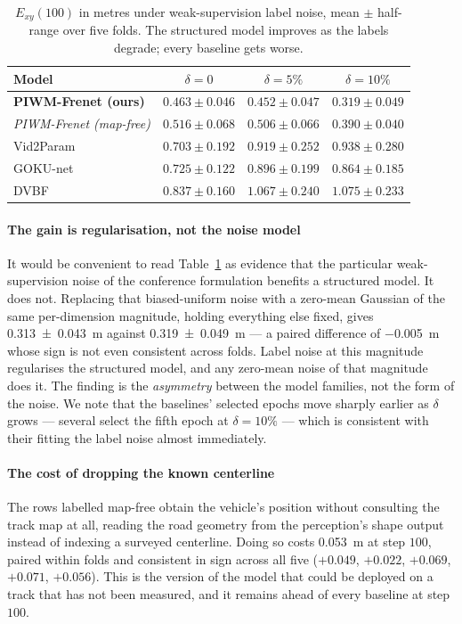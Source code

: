 \begin{table}[t]
\centering
\caption{$E_{xy}(100)$ in metres under weak-supervision label noise, mean $\pm$
half-range over five folds. The structured model improves as the labels degrade;
every baseline gets worse.}
\label{tab:delta}
\begin{tabular}{lccc}
\toprule
Model & $\delta = 0$ & $\delta = 5\%$ & $\delta = 10\%$ \\
\midrule
\textbf{PIWM-Frenet (ours)}     & $0.463 \pm 0.046$ & $0.452 \pm 0.047$ & $\mathbf{0.319 \pm 0.049}$ \\
\textit{PIWM-Frenet (map-free)} & $0.516 \pm 0.068$ & $0.506 \pm 0.066$ & $0.390 \pm 0.040$ \\
Vid2Param                       & $0.703 \pm 0.192$ & $0.919 \pm 0.252$ & $0.938 \pm 0.280$ \\
GOKU-net                        & $0.725 \pm 0.122$ & $0.896 \pm 0.199$ & $0.864 \pm 0.185$ \\
DVBF                            & $0.837 \pm 0.160$ & $1.067 \pm 0.240$ & $1.075 \pm 0.233$ \\
\bottomrule
\end{tabular}
\end{table}

\paragraph{The gain is regularisation, not the noise model}
It would be convenient to read Table~\ref{tab:delta} as evidence that the
particular weak-supervision noise of the conference formulation benefits a
structured model. It does not. Replacing that biased-uniform noise with a
zero-mean Gaussian of the same per-dimension magnitude, holding everything else
fixed, gives \SI{0.313 \pm 0.043}{m} against \SI{0.319 \pm 0.049}{m} --- a
paired difference of \SI{-0.005}{m} whose sign is not even consistent across
folds. Label noise at this magnitude regularises the structured model, and any
zero-mean noise of that magnitude does it. The finding is the \emph{asymmetry}
between the model families, not the form of the noise. We note that the
baselines' selected epochs move sharply earlier as $\delta$ grows --- several
select the fifth epoch at $\delta = 10\%$ --- which is consistent with their
fitting the label noise almost immediately.

\paragraph{The cost of dropping the known centerline}
The rows labelled map-free obtain the vehicle's position without consulting the
track map at all, reading the road geometry from the perception's shape output
instead of indexing a surveyed centerline. Doing so costs \SI{0.053}{m} at step
$100$, paired within folds and consistent in sign across all five
($+0.049$, $+0.022$, $+0.069$, $+0.071$, $+0.056$). This is the version of the
model that could be deployed on a track that has not been measured, and it
remains ahead of every baseline at step $100$.

